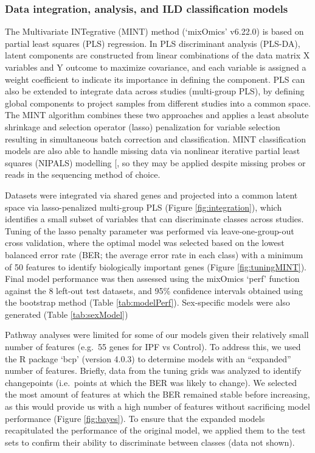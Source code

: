 \documentclass[
]{article}
\begin{document}
\subsubsection{Data integration, analysis, and ILD classification models}\label{data}

The Multivariate INTegrative (MINT) method (`mixOmics' v6.22.0) is based on partial least squares (PLS) regression. In PLS discriminant analysis (PLS-DA), latent components are constructed from linear combinations of the data matrix X variables and Y outcome to maximize covariance, and each variable is assigned a weight coefficient to indicate its importance in defining the component. PLS can also be extended to integrate data across studies (multi-group PLS), by defining global components to project samples from different studies into a common space. The MINT algorithm combines these two approaches and applies a least absolute shrinkage and selection operator (lasso) penalization for variable selection resulting in simultaneous batch correction and classification. MINT classification models are also able to handle missing data via nonlinear iterative partial least squares (NIPALS) modelling {[}\citeproc{ref-wold_nonlinear_1973}{157}{]}, so they may be applied despite missing probes or reads in the sequencing method of choice.

Datasets were integrated via shared genes and projected into a common latent space via lasso-penalized multi-group PLS (Figure \ref{fig:integration}), which identifies a small subset of variables that can discriminate classes across studies. Tuning of the lasso penalty parameter was performed via leave-one-group-out cross validation, where the optimal model was selected based on the lowest balanced error rate (BER; the average error rate in each class) with a minimum of 50 features to identify biologically important genes (Figure \ref{fig:tuningMINT}). Final model performance was then assessed using the mixOmics `perf' function against the 8 left-out test datasets, and 95\% confidence intervals obtained using the bootstrap method (Table \ref{tab:modelPerf}). Sex-specific models were also generated (Table \ref{tab:sexModel})

Pathway analyses were limited for some of our models given their relatively small number of features (e.g.~55 genes for IPF vs Control). To address this, we used the R package `bcp' (version 4.0.3) to determine models with an ``expanded'' number of features. Briefly, data from the tuning grids was analyzed to identify changepoints (i.e.~points at which the BER was likely to change). We selected the most amount of features at which the BER remained stable before increasing, as this would provide us with a high number of features without sacrificing model performance (Figure \ref{fig:bayes}). To ensure that the expanded models recapitulated the performance of the original model, we applied them to the test sets to confirm their ability to discriminate between classes (data not shown).
\end{document}
